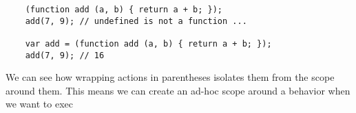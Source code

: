 \documentclass[a4paper,12pt,twoside]{book}
\begin{document}
\begin{lstlisting}
    (function add (a, b) { return a + b; });
    add(7, 9); // undefined is not a function ...
    
    var add = (function add (a, b) { return a + b; });
    add(7, 9); // 16
\end{lstlisting} 
 
 We can see how wrapping actions in parentheses isolates them from the scope around them. This means we can create an ad-hoc scope around a behavior when we want to exec
 
\end{document}
